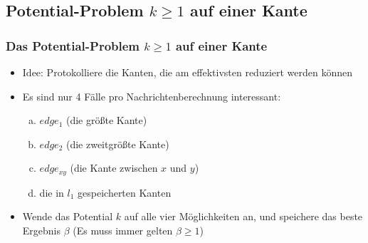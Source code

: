\documentclass{beamer}
\begin{document}
	\subsection{Potential-Problem $k \geq 1$ auf einer Kante}
	\begin{frame}
		\frametitle{Das Potential-Problem $k \geq 1$ auf einer Kante}
		\large
		
		\begin{itemize}
			\item Idee: Protokolliere die Kanten, die am effektivsten reduziert werden können
			
			\item Es sind nur 4 Fälle pro Nachrichtenberechnung interessant:
			
				\begin{enumerate}[a)]
					\item $edge_{1}$ (die größte Kante)
					\item $edge_{2}$ (die zweitgrößte Kante)
					\item $edge_{xy}$ (die Kante zwischen $x$ und $y$)
					\item die in $l_{1}$ gespeicherten Kanten
				\end{enumerate}
				
			\item Wende das Potential $k$ auf alle vier Möglichkeiten an, und speichere das beste Ergebnis $\beta$ (Es muss immer gelten $\beta \geq 1$)
			
		\end{itemize}
		
	\end{frame}
	
\end{document}
